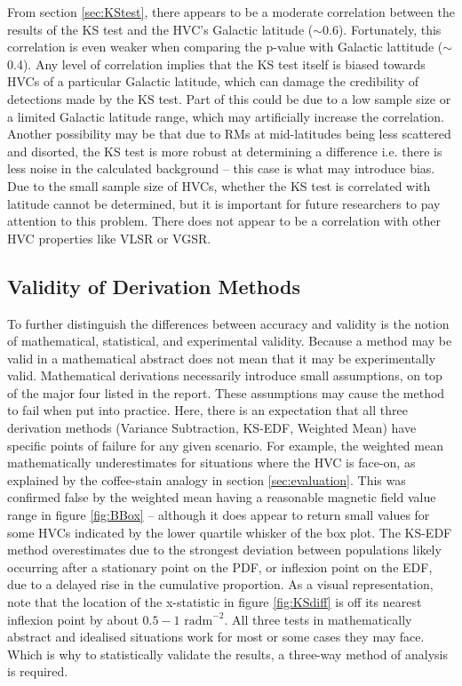From section \ref{sec:KStest}, there appears to be a moderate correlation between the results of the KS test and the HVC's Galactic latitude ($\sim$0.6). Fortunately, this correlation is even weaker when comparing the p-value with Galactic lattitude ($\sim$0.4). Any level of correlation implies that the KS test itself is biased towards HVCs of a particular Galactic latitude, which can damage the credibility of detections made by the KS test. Part of this could be due to a low sample size or a limited Galactic latitude range, which may artificially increase the correlation. Another possibility may be that due to RMs at mid-latitudes being less scattered and disorted, the KS test is more robust at determining a difference i.e. there is less noise in the calculated background – this case is what may introduce bias. Due to the small sample size of HVCs, whether the KS test is correlated with latitude cannot be determined, but it is important for future researchers to pay attention to this problem. There does not appear to be a correlation with other HVC properties like VLSR or VGSR.

\subsection{Validity of Derivation Methods}
\label{ssec:B3}

To further distinguish the differences between accuracy and validity is the notion of mathematical, statistical, and experimental validity. Because a method may be valid in a mathematical abstract does not mean that it may be experimentally valid. Mathematical derivations necessarily introduce small assumptions, on top of the major four listed in the report. These assumptions may cause the method to fail when put into practice. Here, there is an expectation that all three derivation methods (Variance Subtraction, KS-EDF, Weighted Mean) have specific points of failure for any given scenario. For example, the weighted mean mathematically underestimates for situations where the HVC is face-on, as explained by the coffee-stain analogy in section \ref{sec:evaluation}. This was confirmed false by the weighted mean having a reasonable magnetic field value range in figure \ref{fig:BBox} – although it does appear to return small values for some HVCs indicated by the lower quartile whisker of the box plot. The KS-EDF method overestimates due to the strongest deviation between populations likely occurring after a stationary point on the PDF, or inflexion point on the EDF, due to a delayed rise in the cumulative proportion. As a visual representation, note that the location of the x-statistic in figure \ref{fig:KSdiff} is off its nearest inflexion point by about $0.5-1$ $\mathrm{rad m}^{-2}$. All three tests in mathematically abstract and idealised situations work for most or some cases they may face. Which is why to statistically validate the results, a three-way method of analysis is required.


